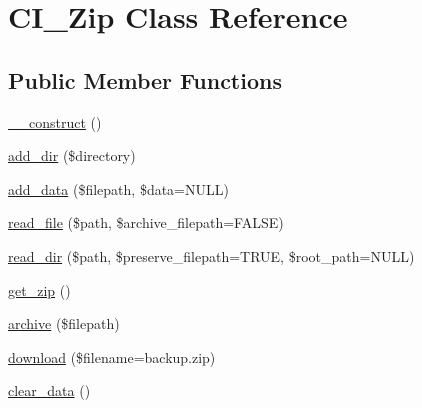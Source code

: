 \hypertarget{class_c_i___zip}{}\section{C\+I\+\_\+\+Zip Class Reference}
\label{class_c_i___zip}
\subsection*{Public Member Functions}
\begin{DoxyCompactItemize}
\item 
\mbox{\hyperlink{class_c_i___zip_a5b39d7c382fd6be6a44005e091fb7abd}{\+\_\+\+\_\+construct}} ()
\item 
\mbox{\hyperlink{class_c_i___zip_a56cd825c1133c573c5c148a13befb29e}{add\+\_\+dir}} (\$directory)
\item 
\mbox{\hyperlink{class_c_i___zip_a79058ef4065ce856fdbae187e4121cdc}{add\+\_\+data}} (\$filepath, \$data=N\+U\+LL)
\item 
\mbox{\hyperlink{class_c_i___zip_a137e7c1159071c08cc6c139261c8048b}{read\+\_\+file}} (\$path, \$archive\+\_\+filepath=F\+A\+L\+SE)
\item 
\mbox{\hyperlink{class_c_i___zip_a24e6d765a787a3036b089f1e5384757d}{read\+\_\+dir}} (\$path, \$preserve\+\_\+filepath=T\+R\+UE, \$root\+\_\+path=N\+U\+LL)
\item 
\mbox{\hyperlink{class_c_i___zip_a8c51b65277a512961ece0d155643badf}{get\+\_\+zip}} ()
\item 
\mbox{\hyperlink{class_c_i___zip_ab694c07bb5d1b91a847b1dfac6701e05}{archive}} (\$filepath)
\item 
\mbox{\hyperlink{class_c_i___zip_adbaee3f609125a672af00ed0f9706944}{download}} (\$filename=\textquotesingle{}backup.\+zip\textquotesingle{})
\item 
\mbox{\hyperlink{class_c_i___zip_a570efcbd88d425ecb7f06f35ef68bf80}{clear\+\_\+data}} ()
\end{DoxyCompactItemize}

